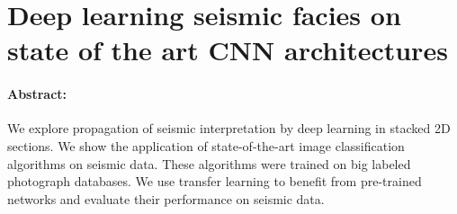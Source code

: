 \section{Deep learning seismic facies on state of the art CNN architectures}

\paragraph{Abstract:} We explore propagation of seismic interpretation by deep learning in stacked 2D sections. We show the application of state-of-the-art image classification algorithms on seismic data. These algorithms were trained on big labeled photograph databases. We use transfer learning to benefit from pre-trained networks and evaluate their performance on seismic data.

{\vfill\hfill\newline{}}


